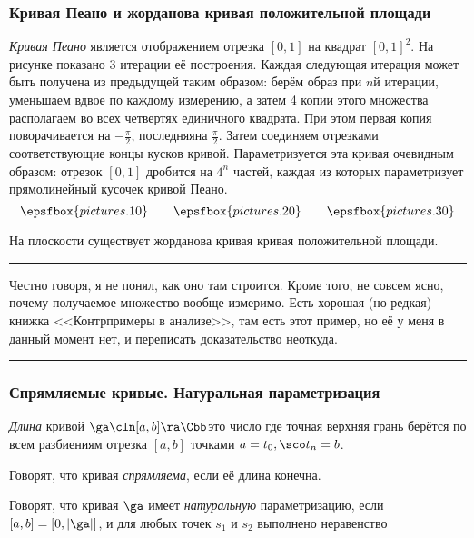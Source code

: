 \documentclass[a4paper]{article}
\newenvironment{petit}
{\par \smallskip \hrule \smallskip \footnotesize}
{\par \smallskip \hrule \smallskip}
\begin{document}
\subsubsection{Кривая Пеано и жорданова кривая положительной площади}

\emph{Кривая Пеано} является отображением отрезка $[0,1]$ на квадрат $[0,1]^2$. На рисунке показано 3 итерации её
построения. Каждая следующая итерация может быть получена из предыдущей таким образом: берём образ при $n$\д й
итерации, уменьшаем вдвое по каждому измерению, а затем 4 копии этого множества располагаем во всех четвертях
единичного квадрата. При этом первая копия поворачивается на $-\frac{\pi}{2}$, последняя\т на $\frac{\pi}{2}$.
Затем соединяем отрезками соответствующие концы кусков кривой. Параметризуется эта кривая очевидным образом: отрезок
$[0,1]$ дробится на $4^n$ частей, каждая из которых параметризует прямолинейный кусочек кривой Пеано.
$$\epsfbox{pictures.10}\quad\quad\epsfbox{pictures.20}\quad\quad\epsfbox{pictures.30}$$

\begin{stm}
На плоскости существует жорданова кривая кривая положительной площади.
\end{stm}

\begin{petit}
Честно говоря, я не понял, как оно там строится. Кроме того, не совсем ясно, почему получаемое
множество вообще измеримо. Есть хорошая (но редкая) книжка <<Контрпримеры в анализе>>,
там есть этот пример, но её у меня в данный момент нет, и переписать доказательство неоткуда.
\end{petit}

\subsubsection{Спрямляемые кривые. Натуральная параметризация}

\begin{df}
\emph{Длина} кривой $\ga\cln [a,b]\ra\Cbb$\т это число
где точная верхняя грань берётся по всем разбиениям отрезка $[a,b]$ точками $a=t_0,\sco t_n=b$.
\end{df}

\begin{df}
Говорят, что кривая \emph{спрямляема}, если её длина конечна.
\end{df}

\begin{df}
Говорят, что кривая $\ga$ имеет \emph{натуральную} параметризацию, если $[a,b] = [0,|\ga|]$, и для любых точек
$s_1$ и  $s_2$ выполнено неравенство
\end{df}
\end{document}
